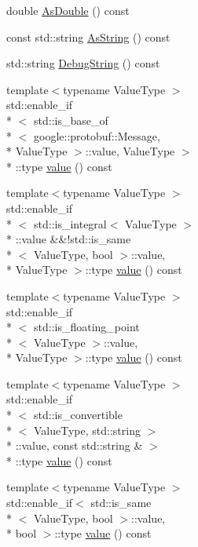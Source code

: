 \begin{DoxyCompactItemize}
double \hyperlink{classapollo_1_1cyber_1_1Parameter_afbfcc7a9bcf9355ebff30ce575ca3cc5}{As\-Double} () const 
\item 
const std\-::string \hyperlink{classapollo_1_1cyber_1_1Parameter_adfa876fd84203bb8e0301bd268260e64}{As\-String} () const 
\item 
std\-::string \hyperlink{classapollo_1_1cyber_1_1Parameter_a4d71bbc64ad58d2bd309d9cf2e44f640}{Debug\-String} () const 
\item 
{\footnotesize template$<$typename Value\-Type $>$ }\\std\-::enable\-\_\-if\\*
$<$ std\-::is\-\_\-base\-\_\-of\\*
$<$ google\-::protobuf\-::\-Message, \\*
Value\-Type $>$\-::value, Value\-Type $>$\\*
\-::type \hyperlink{classapollo_1_1cyber_1_1Parameter_a768aa5c2af5ee132b23bd1081df0b624}{value} () const 
\item 
{\footnotesize template$<$typename Value\-Type $>$ }\\std\-::enable\-\_\-if\\*
$<$ std\-::is\-\_\-integral$<$ Value\-Type $>$\\*
\-::value \&\&!std\-::is\-\_\-same\\*
$<$ Value\-Type, bool $>$\-::value, \\*
Value\-Type $>$\-::type \hyperlink{classapollo_1_1cyber_1_1Parameter_a09f62e5f348c2980472c63ef60aee19e}{value} () const 
\item 
{\footnotesize template$<$typename Value\-Type $>$ }\\std\-::enable\-\_\-if\\*
$<$ std\-::is\-\_\-floating\-\_\-point\\*
$<$ Value\-Type $>$\-::value, \\*
Value\-Type $>$\-::type \hyperlink{classapollo_1_1cyber_1_1Parameter_acb21950095c7f082e53a69d185d09db6}{value} () const 
\item 
{\footnotesize template$<$typename Value\-Type $>$ }\\std\-::enable\-\_\-if\\*
$<$ std\-::is\-\_\-convertible\\*
$<$ Value\-Type, std\-::string $>$\\*
\-::value, const std\-::string \& $>$\\*
\-::type \hyperlink{classapollo_1_1cyber_1_1Parameter_a8f07da13a7e689fd2a05ffdb2789f8c4}{value} () const 
\item 
{\footnotesize template$<$typename Value\-Type $>$ }\\std\-::enable\-\_\-if$<$ std\-::is\-\_\-same\\*
$<$ Value\-Type, bool $>$\-::value, \\*
bool $>$\-::type \hyperlink{classapollo_1_1cyber_1_1Parameter_a380d65d34dc7d2a0c4221647316b71da}{value} () const 
\end{DoxyCompactItemize}
